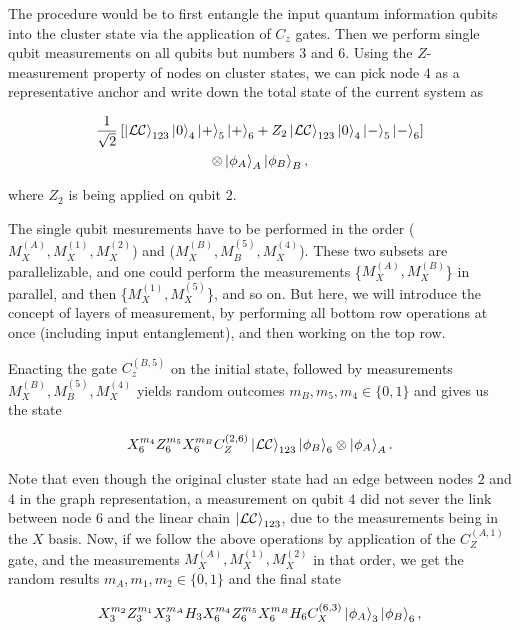\documentclass[twocolumn]{Styles/IEEEtran11}
\begin{document}
The procedure would be to first entangle the input quantum information qubits into the cluster state via the application of $C_z$ gates. Then we perform single qubit measurements on all qubits but numbers $3$ and $6$. Using the $Z$-measurement property of nodes on cluster states, we can pick node $4$ as a representative anchor and write down the total state of the current system as

\begin{gather*}
  \frac{1}{\sqrt{2}}\left[\left|\mspace{0.5mu} \mathcal{LC} \mspace{0.5mu}\right\rangle_{123}\left|\mspace{0.5mu} 0 \mspace{0.5mu}\right\rangle_4\left|\mspace{0.5mu} + \mspace{0.5mu}\right\rangle_5\left|\mspace{0.5mu} + \mspace{0.5mu}\right\rangle_6+Z_{2}\left|\mspace{0.5mu} \mathcal{LC} \mspace{0.5mu}\right\rangle_{123}\left|\mspace{0.5mu} 0 \mspace{0.5mu}\right\rangle_4\left|\mspace{0.5mu} - \mspace{0.5mu}\right\rangle_5\left|\mspace{0.5mu} - \mspace{0.5mu}\right\rangle_6\right]\\\otimes\left|\mspace{0.5mu} \phi_A \mspace{0.5mu}\right\rangle_A\left|\mspace{0.5mu} \phi_B \mspace{0.5mu}\right\rangle_B,
\end{gather*}

\noindent where $Z_{2}$ is being applied on qubit $2$.

The single qubit mesurements have to be performed in the order ($M^{(A)}_X, M^{(1)}_X, M^{(2)}_X$) and ($M^{(B)}_X, M^{(5)}_B, M^{(4)}_X$). These two subsets are parallelizable, and one could perform the measurements \{$M^{(A)}_X, M^{(B)}_X$\} in parallel, and then \{$M^{(1)}_X, M^{(5)}_X$\}, and so on. But here, we will introduce the concept of layers of measurement, by performing all bottom row operations at once (including input entanglement), and then working on the top row.

Enacting the gate $C_z^{(B,5)}$ on the initial state, followed by measurements $M^{(B)}_X, M^{(5)}_B, M^{(4)}_X$ yields random outcomes $m_B, m_5, m_4 \in \{0,1\}$ and  gives us the state

\begin{gather*}
  X_6^{m_4}Z_6^{m_5}X_6^{m_B}C_Z^{(2,6)}\left|\mspace{0.5mu} \mathcal{LC} \mspace{0.5mu}\right\rangle_{123}\left|\mspace{0.5mu} \phi_B \mspace{0.5mu}\right\rangle_6\otimes\left|\mspace{0.5mu} \phi_A \mspace{0.5mu}\right\rangle_A.
\end{gather*}

Note that even though the original cluster state had an edge between nodes $2$ and $4$ in the graph representation, a measurement on qubit $4$ did not sever the link between node $6$ and the linear chain $\left|\mspace{0.5mu} \mathcal{LC} \mspace{0.5mu}\right\rangle_{123}$, due to the measurements being in the $X$ basis. Now, if we follow the above operations by application of the $C_Z^{(A,1)}$ gate, and the measurements $M^{(A)}_X, M^{(1)}_X, M^{(2)}_X$ in that order, we get the random results $m_A, m_1, m_2 \in \{0,1\}$ and the final state

\begin{gather*}
  X_3^{m_2}Z_3^{m_1}X_3^{m_A}H_3X_6^{m_4}Z_6^{m_5}X_6^{m_B}H_6C_X^{(6,3)}\left|\mspace{0.5mu} \phi_A \mspace{0.5mu}\right\rangle_3\left|\mspace{0.5mu} \phi_B \mspace{0.5mu}\right\rangle_6,
\end{gather*}
\end{document}
